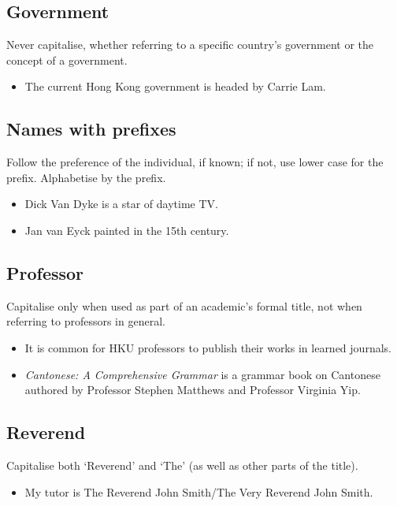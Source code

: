 \documentclass[11pt,a4paper]{book}
\newcommand{\cmark}{{\color{green(html/cssgreen)}\checkmark}}%
\begin{document}
			\subsection{Government}
			Never capitalise, whether referring to a specific country's government or the concept of a government.
				{\firasans \begin{mdframed}[backgroundcolor=aliceblue] \begin{itemize}[label=\cmark]
					\item The current Hong Kong government is headed by Carrie Lam.
				\end{itemize} \end{mdframed} }
			\subsection{Names with prefixes}
			Follow the preference of the individual, if known; if not, use lower case for the prefix. Alphabetise by the prefix.
				{\firasans \begin{mdframed}[backgroundcolor=aliceblue] \begin{itemize}[label=\cmark]
					\item Dick Van Dyke is a star of daytime TV.
					\item Jan van Eyck painted in the 15th century.
				\end{itemize} \end{mdframed} }
			\subsection{Professor}
				Capitalise only when used as part of an academic's formal title, not when referring to professors in general.
					{\firasans \begin{mdframed}[backgroundcolor=aliceblue] \begin{itemize}[label=\cmark]
						\item It is common for HKU professors to publish their works in learned journals.
						\item \textit{Cantonese: A Comprehensive Grammar} is a grammar book on Cantonese authored by Professor Stephen Matthews and Professor Virginia Yip.
					\end{itemize} \end{mdframed} }
			\subsection{Reverend}
			Capitalise both `Reverend' and `The' (as well as other parts of the title).
				{\firasans \begin{mdframed}[backgroundcolor=aliceblue] \begin{itemize}[label=\cmark]
					\item My tutor is The Reverend John Smith/The Very Reverend John Smith.
				\end{itemize} \end{mdframed} }
\end{document}

